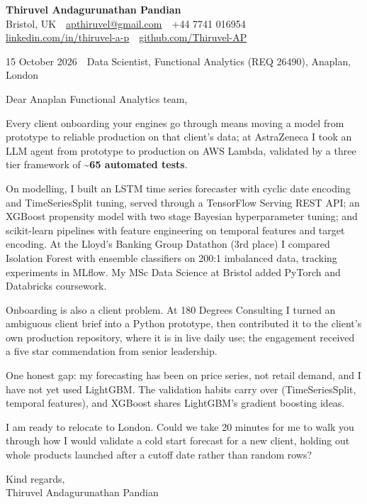 \documentclass[a4paper,11pt]{article}
\begin{document}
{\fontsize{20}{24}\selectfont\bfseries\color{navy} Thiruvel Andagurunathan Pandian}\\[2pt]
{\small Bristol, UK \,\textperiodcentered\, \href{mailto:apthiruvel@gmail.com}{apthiruvel@gmail.com} \,\textperiodcentered\, +44 7741 016954 \,\textperiodcentered\, \href{https://www.linkedin.com/in/thiruvel-a-p/}{linkedin.com/in/thiruvel-a-p} \,\textperiodcentered\, \href{https://github.com/Thiruvel-AP}{github.com/Thiruvel-AP}}

{\color{muted}\small 15 October 2026 \,\textperiodcentered\, Data Scientist, Functional Analytics (REQ 26490), Anaplan, London}

Dear Anaplan Functional Analytics team,

Every client onboarding your engines go through means moving a model from prototype to reliable production on that client's data; at AstraZeneca I took an LLM agent from prototype to production on AWS Lambda, validated by a three tier framework of \textbf{\textasciitilde65 automated tests}.

On modelling, I built an LSTM time series forecaster with cyclic date encoding and TimeSeriesSplit tuning, served through a TensorFlow Serving REST API; an XGBoost propensity model with two stage Bayesian hyperparameter tuning; and scikit-learn pipelines with feature engineering on temporal features and target encoding. At the Lloyd's Banking Group Datathon (3rd place) I compared Isolation Forest with ensemble classifiers on 200:1 imbalanced data, tracking experiments in MLflow. My MSc Data Science at Bristol added PyTorch and Databricks coursework.

Onboarding is also a client problem. At 180 Degrees Consulting I turned an ambiguous client brief into a Python prototype, then contributed it to the client's own production repository, where it is in live daily use; the engagement received a five star commendation from senior leadership.

One honest gap: my forecasting has been on price series, not retail demand, and I have not yet used LightGBM. The validation habits carry over (TimeSeriesSplit, temporal features), and XGBoost shares LightGBM's gradient boosting ideas.

I am ready to relocate to London. Could we take 20 minutes for me to walk you through how I would validate a cold start forecast for a new client, holding out whole products launched after a cutoff date rather than random rows?

Kind regards,\\
Thiruvel Andagurunathan Pandian
\end{document}
